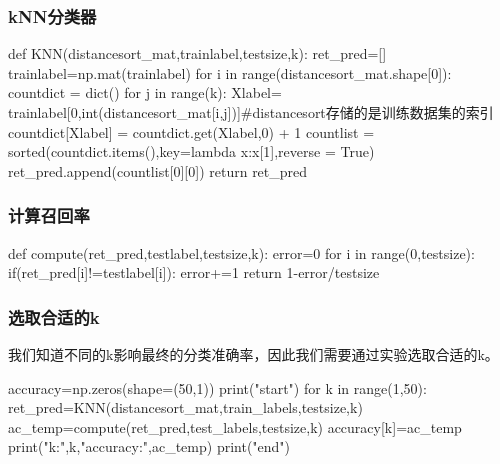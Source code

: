\subsubsection{kNN分类器}
\begin{python}
  def KNN(distancesort_mat,trainlabel,testsize,k):
    ret_pred=[]
    trainlabel=np.mat(trainlabel)
    for i in range(distancesort_mat.shape[0]):
        countdict = dict()
        for j in range(k):
            Xlabel= trainlabel[0,int(distancesort_mat[i,j])]#distancesort存储的是训练数据集的索引
            countdict[Xlabel] = countdict.get(Xlabel,0) + 1
        countlist = sorted(countdict.items(),key=lambda x:x[1],reverse = True)
        ret_pred.append(countlist[0][0])
    return ret_pred
\end{python}
\subsubsection{计算召回率}
\begin{python}
  def compute(ret_pred,testlabel,testsize,k):
    error=0
    for i in range(0,testsize):
        if(ret_pred[i]!=testlabel[i]):
            error+=1
    return 1-error/testsize
\end{python}
\subsubsection{选取合适的k}
我们知道不同的k影响最终的分类准确率，因此我们需要通过实验选取合适的k。
\begin{python}
  accuracy=np.zeros(shape=(50,1))
  print("start")
  for k in range(1,50):
    ret_pred=KNN(distancesort_mat,train_labels,testsize,k)
    ac_temp=compute(ret_pred,test_labels,testsize,k)
    accuracy[k]=ac_temp
    print("k:",k,"accuracy:",ac_temp)
  print("end")
\end{python}
